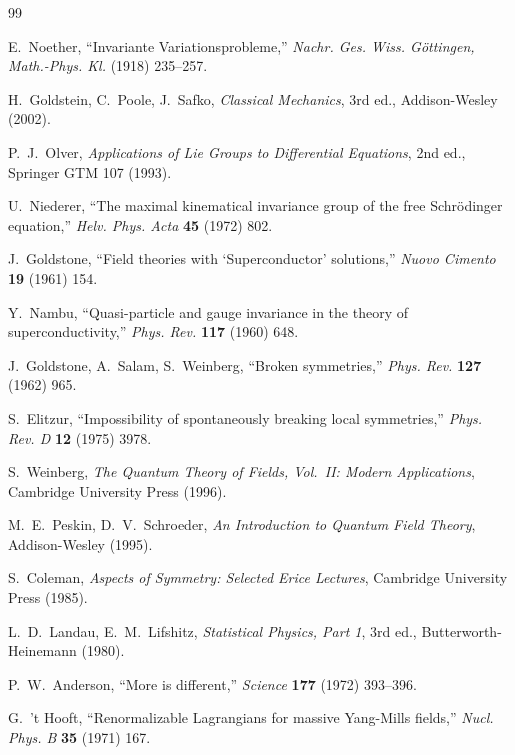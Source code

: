 \documentclass[11pt]{article}
\theoremstyle{definition}
\theoremstyle{remark}
\begin{document}
\begin{thebibliography}{99}

 E.~Noether, ``Invariante Variationsprobleme,'' \emph{Nachr. Ges. Wiss. G\"ottingen, Math.-Phys. Kl.} (1918) 235--257.

 H.~Goldstein, C.~Poole, J.~Safko, \emph{Classical Mechanics}, 3rd ed., Addison-Wesley (2002).

 P.~J.~Olver, \emph{Applications of Lie Groups to Differential Equations}, 2nd ed., Springer GTM 107 (1993).

 U.~Niederer, ``The maximal kinematical invariance group of the free Schr\"odinger equation,'' \emph{Helv. Phys. Acta} \textbf{45} (1972) 802.

 J.~Goldstone, ``Field theories with `Superconductor' solutions,'' \emph{Nuovo Cimento} \textbf{19} (1961) 154.

 Y.~Nambu, ``Quasi-particle and gauge invariance in the theory of superconductivity,'' \emph{Phys. Rev.} \textbf{117} (1960) 648.

 J.~Goldstone, A.~Salam, S.~Weinberg, ``Broken symmetries,'' \emph{Phys. Rev.} \textbf{127} (1962) 965.

 S.~Elitzur, ``Impossibility of spontaneously breaking local symmetries,'' \emph{Phys. Rev. D} \textbf{12} (1975) 3978.

 S.~Weinberg, \emph{The Quantum Theory of Fields, Vol.~II: Modern Applications}, Cambridge University Press (1996).

 M.~E.~Peskin, D.~V.~Schroeder, \emph{An Introduction to Quantum Field Theory}, Addison-Wesley (1995).

 S.~Coleman, \emph{Aspects of Symmetry: Selected Erice Lectures}, Cambridge University Press (1985).

 L.~D.~Landau, E.~M.~Lifshitz, \emph{Statistical Physics, Part 1}, 3rd ed., Butterworth-Heinemann (1980).

 P.~W.~Anderson, ``More is different,'' \emph{Science} \textbf{177} (1972) 393--396.

 G.~'t Hooft, ``Renormalizable Lagrangians for massive Yang-Mills fields,'' \emph{Nucl. Phys. B} \textbf{35} (1971) 167.

\end{thebibliography}
\end{document}
